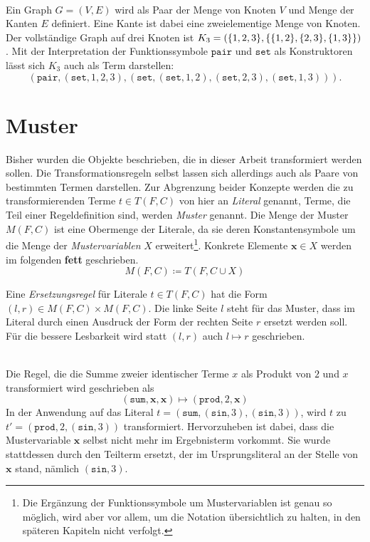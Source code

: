 \begin{beispiel}~\\
Ein Graph $G = (V, E)$ wird als Paar der Menge von Knoten $V$ und Menge der Kanten $E$ definiert. Eine Kante ist dabei eine zweielementige Menge von Knoten. Der vollständige Graph auf drei Knoten ist $K_3 = \paren*{\{1, 2, 3\}, \curl*{\{1, 2\}, \{2, 3\}, \{1, 3\}}}$. Mit der Interpretation der Funktionssymbole $\texttt{pair}$ und $\texttt{set}$ als Konstruktoren lässt sich $K_3$ auch als Term darstellen:
$$(\texttt{pair}, (\texttt{set}, 1, 2, 3), (\texttt{set}, (\texttt{set}, 1, 2), (\texttt{set}, 2, 3), (\texttt{set}, 1, 3))).$$
\end{beispiel}





\section{Muster} \label{subsecMuster}

Bisher wurden die Objekte beschrieben, die in dieser Arbeit transformiert werden sollen. Die Transformationsregeln selbst lassen sich allerdings auch als Paare von bestimmten Termen darstellen. Zur Abgrenzung beider Konzepte werden die zu transformierenden Terme $t\in T(F, C)$ von hier an \emph{Literal} genannt, Terme, die  Teil einer Regeldefinition sind, werden \emph{Muster} genannt. Die Menge der Muster $M(F, C)$ ist eine Obermenge der Literale, da sie deren Konstantensymbole um die Menge der \emph{Mustervariablen} $X$ erweitert\footnote{Die Ergänzung der Funktionssymbole um Mustervariablen ist genau so möglich, wird aber vor allem, um die Notation übersichtlich zu halten, in den späteren Kapiteln nicht verfolgt.}. Konkrete Elemente $\mathbf x \in X$ werden im folgenden \textbf{fett} geschrieben.
$$M(F, C) \coloneqq T(F, C \cup X)$$

Eine \emph{Ersetzungsregel} für Literale $t \in T(F, C)$ hat die Form $(l, r) \in M(F, C) \times M(F, C)$. Die linke Seite $l$ steht für das Muster, dass im Literal durch einen Ausdruck der Form der rechten Seite $r$ ersetzt werden soll. Für die bessere Lesbarkeit wird statt $(l, r)$ auch $l \mapsto r$ geschrieben.

\begin{beispiel}~\\ \label{bMuster}
Die Regel, die die Summe zweier identischer Terme $x$ als Produkt von $2$ und $x$ transformiert wird geschrieben als
$$(\texttt{sum}, \mathbf x, \mathbf x) \mapsto (\texttt{prod}, 2, \mathbf x)$$
In der Anwendung auf das Literal 
$t = (\texttt{sum}, (\texttt{sin}, 3), (\texttt{sin}, 3))$, wird $t$ zu $t' = (\texttt{prod}, 2, (\texttt{sin}, 3))$ transformiert. 
Hervorzuheben ist dabei, dass die Mustervariable $\mathbf x$ selbst nicht mehr im Ergebnisterm vorkommt. Sie wurde stattdessen durch den Teilterm ersetzt, der im Ursprungsliteral an der Stelle von $\mathbf x$ stand, nämlich $(\texttt{sin}, 3)$.
\end{beispiel}

